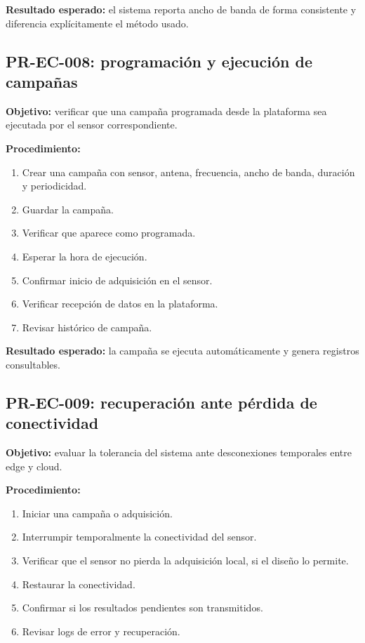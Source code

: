 \textbf{Resultado esperado:} el sistema reporta ancho de banda de forma consistente y diferencia explícitamente el método usado.

\subsection{PR-EC-008: programación y ejecución de campañas}

\textbf{Objetivo:} verificar que una campaña programada desde la plataforma sea ejecutada por el sensor correspondiente.

\textbf{Procedimiento:}

\begin{enumerate}
    \item Crear una campaña con sensor, antena, frecuencia, ancho de banda, duración y periodicidad.
    \item Guardar la campaña.
    \item Verificar que aparece como programada.
    \item Esperar la hora de ejecución.
    \item Confirmar inicio de adquisición en el sensor.
    \item Verificar recepción de datos en la plataforma.
    \item Revisar histórico de campaña.
\end{enumerate}

\textbf{Resultado esperado:} la campaña se ejecuta automáticamente y genera registros consultables.

\subsection{PR-EC-009: recuperación ante pérdida de conectividad}

\textbf{Objetivo:} evaluar la tolerancia del sistema ante desconexiones temporales entre edge y cloud.

\textbf{Procedimiento:}

\begin{enumerate}
    \item Iniciar una campaña o adquisición.
    \item Interrumpir temporalmente la conectividad del sensor.
    \item Verificar que el sensor no pierda la adquisición local, si el diseño lo permite.
    \item Restaurar la conectividad.
    \item Confirmar si los resultados pendientes son transmitidos.
    \item Revisar logs de error y recuperación.
\end{enumerate}

